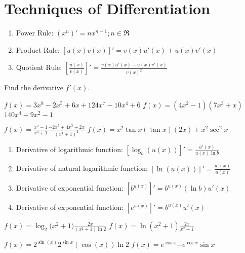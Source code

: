 \section{Techniques of Differentiation}

\begin{myframe}[arc=10pt,auto outer arc]
	\begin{enumerate}
		\item Power Rule: $\left( x^n \right)' = nx^{n-1};  n\in\Re$
		\item Product Rule: $\left[u\left(x\right)v\left(x\right)\right]' = v(x) u'(x) + u(x) v'(x)$
		\item Quotient Rule: $\displaystyle\left[\frac{u\left(x\right)}{v\left(x\right)}\right]' = \frac{v(x) u'(x) - u(x) v'(x) }{ v(x)^2}$
	\end{enumerate}
\end{myframe}

\noindent Find the derivative $f'\left(x\right)$.

\pairofprobsans%
{$\displaystyle f\left(x\right) = 3x^8 - 2x^5 + 6x + 1$}{$24x^7 - 10x^4 + 6$}%
{$\displaystyle f\left(x\right) = \left(4x^2 - 1\right)\left(7x^3 + x\right)$}{$140x^4 - 9x^2 - 1$}

\pairofprobsans%
{$\displaystyle f\left(x\right) = \frac{x^2 - 1}{x^4 + 1}$}{$\displaystyle \frac{-2x^5 + 4x^3 + 2x}{(x^4+1)^2}$}%
{$\displaystyle f\left(x\right) = x^2 \tan{x}$}{$\displaystyle (\tan{x})(2x) + x^2 \sec^2{x}$}

\newpage
\begin{myframe}[arc=10pt,auto outer arc]
	\begin{enumerate}
		\item Derivative of logarithmic function: $\displaystyle \left[\log_b(u(x))\right]' = \frac{u'(x)}{u(x) \ln{b}}$
		\item Derivative of natural logarithmic function: $\displaystyle \left[\ln(u(x))\right]' = \frac{u'(x)}{u(x)}$
		\item Derivative of exponential function: $\displaystyle \left[b^{u(x)}\right]' = b^{u(x)} (\ln{b} )u'(x)$
		\item Derivative of exponential function: $\displaystyle \left[e^{u(x)}\right]' = b^{u(x)} u'(x)$
	\end{enumerate}
\end{myframe}

\pairofprobsans%
{$\displaystyle f\left(x\right) = \log_2{(x^2+1})$}{$\displaystyle \frac{2x}{(x^2+ 1) \ln{2}}$}%
{$\displaystyle f\left(x\right) = \ln{(x^2 + 1)}$}{$\displaystyle \frac{2x}{x^2+ 1}$}

\pairofprobsans%
{$\displaystyle f\left(x\right) = 2^{\sin{(x)}}$}{$2^{\sin{x}}(\cos{(x)})\ln{2}$}%
{$\displaystyle f\left(x\right) = e^{\cos{x}}$}{$\displaystyle -e^{\cos{x}}\sin{x}$}